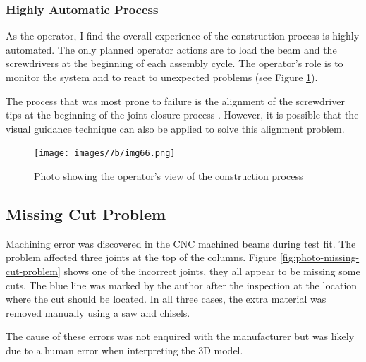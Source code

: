 \subsubsection{Highly Automatic Process}
\label{subsubsection:exploration-4-highly-automatic-process}

As the operator, I find the overall experience of the construction process is highly automated. The only planned operator actions are to load the beam and the screwdrivers at the beginning of each assembly cycle. The operator’s role is to monitor the system and to react to unexpected problems (see Figure \ref{fig:operator-view-of-the-construction-process}).

The process that was most prone to failure is the alignment of the screwdriver tips at the beginning of the joint closure process . However, it is possible that the visual guidance technique can also be applied to solve this alignment problem. 

\begin{figure}[!h]
    \centering
    \texttt{[image: images/7b/img66.png]}
    \caption{Photo showing the operator's view of the construction process}
    \label{fig:operator-view-of-the-construction-process}
\end{figure}

\subsection{Missing Cut Problem}
\label{subsection:exploration-4-missing-cut-problem}

Machining error was discovered in the CNC machined beams during test fit. The problem affected three joints at the top of the columns. Figure \ref{fig:photo-missing-cut-problem} shows one of the incorrect joints, they all appear to be missing some cuts. The blue line was marked by the author after the inspection at the location where the cut should be located. In all three cases, the extra material was removed manually using a saw and chisels. 

The cause of these errors was not enquired with the manufacturer but was likely due to a human error when interpreting the 3D model.


